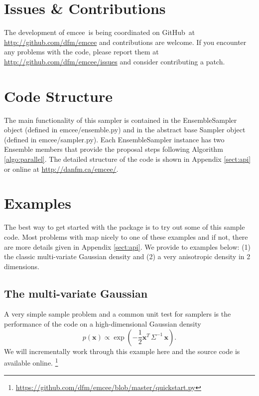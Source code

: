 \documentclass[12pt,preprint]{aastex}
\newcommand{\project}[1]{{\sffamily #1}}
\newcommand{\github}{\project{GitHub}}
\newcommand{\thisplain}{emcee}
\newcommand{\this}{\project{\thisplain}}
\newcommand{\code}[1]{{\sffamily #1}}
\newcommand{\eqlabel}[1]{\label{eq:#1}}
\newcommand{\app}[1]{Appendix \ref{sect:#1}}
\newcommand{\algo}[1]{Algorithm \ref{algo:#1}}
\newcommand{\pr}[1]{\ensuremath{p(#1)}}
\begin{document}
\section{Issues \& Contributions}

The development of \this\ is being coordinated on \github\ at
\url{http://github.com/dfm/emcee} and contributions are welcome. If you
encounter any problems with the code, please report them at
\url{http://github.com/dfm/emcee/issues} and consider
contributing a patch.

\section{Code Structure}

The main functionality of this sampler is contained in the
\code{EnsembleSampler} object (defined in \code{emcee/ensemble.py}) and
in the abstract base \code{Sampler} object (defined in
\code{emcee/sampler.py}). Each \code{EnsembleSampler} instance has two
\code{Ensemble} members that provide the proposal steps following
\algo{parallel}. The detailed structure of the code is shown in
\app{api} or online at \url{http://danfm.ca/emcee/}.

\section{Examples}

The best way to get started with the package is to try out some of this
sample code. Most problems with map nicely to one of these examples and
if not, there are more details given in \app{api}. We provide to examples
below: (1) the classic multi-variate Gaussian density and (2) a very
anisotropic density in 2 dimensions.

\subsection{The multi-variate Gaussian}

A very simple sample problem and a common unit test for samplers is
the performance of the code on a high-dimensional Gaussian density
\begin{equation}\eqlabel{mgauss}
    \pr{\mathbf{x}} \propto \exp\left ( -\frac{1}{2} \mathbf{x}^T \,
                                \Sigma^{-1} \, \mathbf{x} \right ).
\end{equation}
We will incrementally work through this example here and the source code
is available online.%
\footnote{\url{https://github.com/dfm/emcee/blob/master/quickstart.py}}
\end{document}
